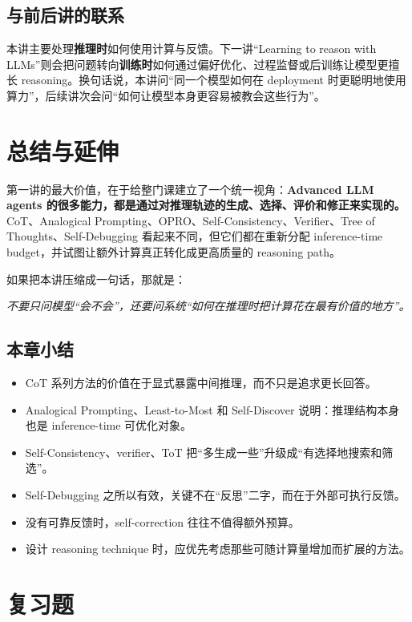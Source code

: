 \documentclass[a4paper]{article}
\begin{document}
\subsection{与前后讲的联系}

本讲主要处理\textbf{推理时}如何使用计算与反馈。下一讲“Learning to reason with LLMs”则会把问题转向\textbf{训练时}如何通过偏好优化、过程监督或后训练让模型更擅长 reasoning。换句话说，本讲问“同一个模型如何在 deployment 时更聪明地使用算力”，后续讲次会问“如何让模型本身更容易被教会这些行为”。

\section{总结与延伸}

第一讲的最大价值，在于给整门课建立了一个统一视角：\textbf{Advanced LLM agents 的很多能力，都是通过对推理轨迹的生成、选择、评价和修正来实现的。} CoT、Analogical Prompting、OPRO、Self-Consistency、Verifier、Tree of Thoughts、Self-Debugging 看起来不同，但它们都在重新分配 inference-time budget，并试图让额外计算真正转化成更高质量的 reasoning path。

如果把本讲压缩成一句话，那就是：

\begin{center}
\emph{不要只问模型“会不会”，还要问系统“如何在推理时把计算花在最有价值的地方”。}
\end{center}

\subsection{本章小结}

\begin{itemize}
\item CoT 系列方法的价值在于显式暴露中间推理，而不只是追求更长回答。
\item Analogical Prompting、Least-to-Most 和 Self-Discover 说明：推理结构本身也是 inference-time 可优化对象。
\item Self-Consistency、verifier、ToT 把“多生成一些”升级成“有选择地搜索和筛选”。
\item Self-Debugging 之所以有效，关键不在“反思”二字，而在于外部可执行反馈。
\item 没有可靠反馈时，self-correction 往往不值得额外预算。
\item 设计 reasoning technique 时，应优先考虑那些可随计算量增加而扩展的方法。
\end{itemize}

\section{复习题}
\end{document}
